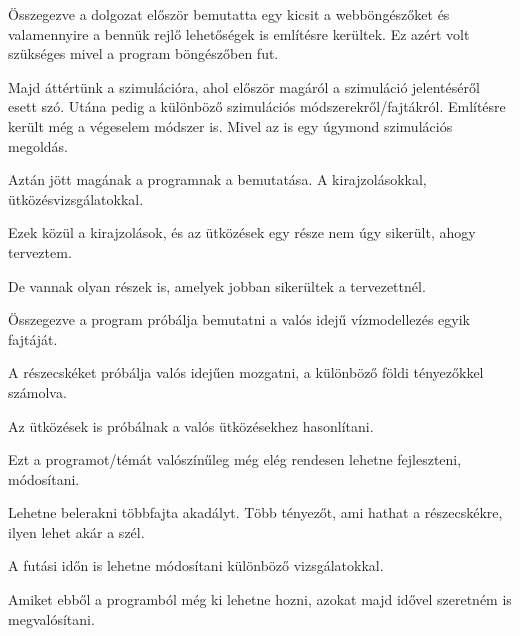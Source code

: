 



Összegezve a dolgozat először bemutatta egy kicsit a webböngészőket és valamennyire a bennük rejlő lehetőségek is említésre kerültek. Ez azért volt szükséges mivel a program böngészőben fut. 

Majd áttértünk a szimulációra, ahol először magáról a szimuláció jelentéséről esett szó. Utána pedig a különböző szimulációs módszerekről/fajtákról. Említésre került még a végeselem módszer is. Mivel az is egy úgymond szimulációs megoldás. 


Aztán jött magának a programnak a bemutatása. A kirajzolásokkal, ütközésvizsgálatokkal. 

Ezek közül a kirajzolások, és az ütközések egy része nem úgy sikerült, ahogy terveztem. 

De vannak olyan részek is, amelyek jobban sikerültek a tervezettnél. 


Összegezve a program próbálja bemutatni a valós idejű vízmodellezés egyik fajtáját. 

A részecskéket próbálja valós idejűen mozgatni, a különböző földi tényezőkkel számolva. 

Az ütközések is próbálnak a valós ütközésekhez hasonlítani. 


Ezt a programot/témát valószínűleg még elég rendesen lehetne fejleszteni, módosítani. 

Lehetne belerakni többfajta akadályt. Több tényezőt, ami hathat a részecskékre, ilyen lehet akár a szél. 

A futási időn is lehetne módosítani különböző vizsgálatokkal. 

Amiket ebből a programból még ki lehetne hozni, azokat majd idővel szeretném is megvalósítani. 
